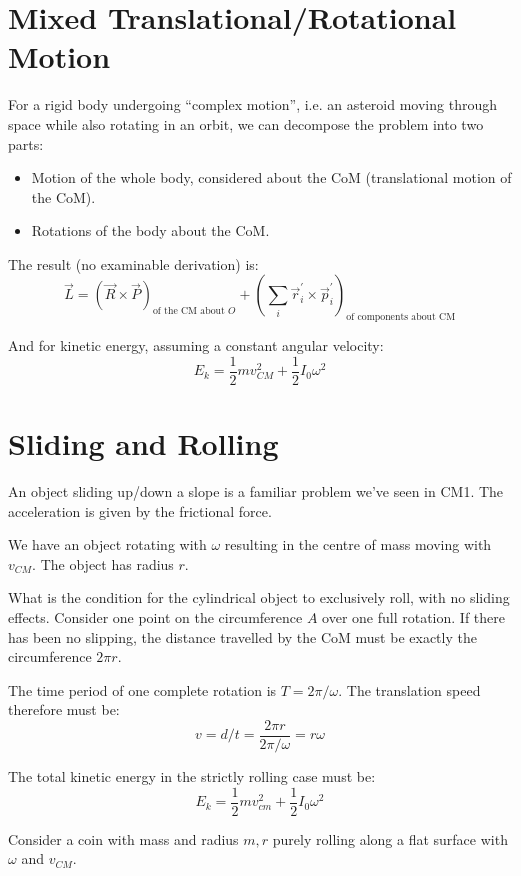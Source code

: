 
\section{Mixed Translational/Rotational Motion}
For a rigid body undergoing ``complex motion'', i.e. an asteroid moving through space while also rotating in an orbit, we can decompose the problem into two parts:
\begin{itemize}
    \item Motion of the whole body, considered about the CoM (translational motion of the CoM).
    \item Rotations of the body about the CoM.
\end{itemize}

The result (no examinable derivation) is:
\[
    \vec{L} = \left(\vec{R} \times \vec{P}\right)_\text{of the CM about $O$} + \left(\sum_i \vec{r}_i^\prime \times \vec{p}_i^\prime\right)_\text{of components about CM}
\]

And for kinetic energy, assuming a constant angular velocity:
\[
    E_k = \frac{1}{2}mv_{CM}^2 + \frac{1}{2}I_0 \omega^2
\]

\section{Sliding and Rolling}
An object sliding up/down a slope is a familiar problem we've seen in CM1. The acceleration is given by the frictional force.

We have an object rotating with $\omega$ resulting in the centre of mass moving with $v_{CM}$. The object has radius $r$.

What is the condition for the cylindrical object to exclusively roll, with no sliding effects. Consider one point on the circumference $A$ over one full rotation. If there has been no slipping, the distance travelled by the CoM must be exactly the circumference $2 \pi r$.

The time period of one complete rotation is $T = 2 \pi / \omega$. The translation speed therefore must be:
\[
    v = d/t = \frac{2 \pi r}{2 \pi / \omega} = r \omega
\]

The total kinetic energy in the strictly rolling case must be:
\[
    E_k = \frac{1}{2}mv_{cm}^2 + \frac{1}{2}I_0 \omega^2
\]

Consider a coin with mass and radius $m, r$ purely rolling along a flat surface with $\omega$ and $v_{CM}$.

